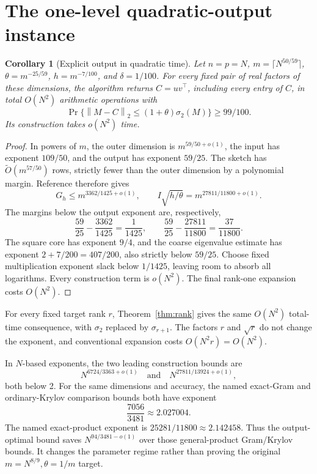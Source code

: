 \documentclass[11pt]{article}
\newtheorem{corollary}[theorem]{Corollary}
\newcommand{\norm}[1]{\left\lVert#1\right\rVert}
\newcommand{\tO}{\widetilde O}
\begin{document}
\section{The one-level quadratic-output instance}
\begin{corollary}[Explicit output in quadratic time]\label{cor:output}
Let \(n=p=N\), \(m=\lceil N^{50/59}\rceil\),
\(\theta=m^{-25/59}\), \(h=m^{-7/100}\), and \(\delta=1/100\).
For every fixed pair of real factors of these dimensions, the algorithm
returns \(C=uv^\top\), including every entry of \(C\), in total
\(O(N^2)\) arithmetic operations with
\[
 \Pr\{\norm{M-C}_2\leq(1+\theta)\sigma_2(M)\}\geq99/100.
\]
Its construction takes \(o(N^2)\) time.
\end{corollary}
\begin{proof}
In powers of \(m\), the outer dimension is \(m^{59/50+o(1)}\),
the input has exponent \(109/50\), and the output has exponent
\(59/25\). The sketch has \(\tO(m^{57/50})\) rows, strictly fewer
than the outer dimension by a polynomial margin. Reference \cite{amanov}
therefore gives
\[
 G_h\leq m^{3362/1425+o(1)},\qquad
 I\sqrt{h/\theta}=m^{27811/11800+o(1)}.
\]
The margins below the output exponent are, respectively,
\[
 \frac{59}{25}-\frac{3362}{1425}=\frac1{1425},\qquad
 \frac{59}{25}-\frac{27811}{11800}=\frac{37}{11800}.
\]
The square core has exponent \(9/4\), and the coarse eigenvalue estimate
has exponent \(2+7/200=407/200\), also strictly below \(59/25\).
Choose fixed multiplication exponent slack below \(1/1425\), leaving
room to absorb all logarithms. Every construction term is \(o(N^2)\).
The final rank-one expansion costs \(O(N^2)\).
\end{proof}

For every fixed target rank \(r\), Theorem~\ref{thm:rank} gives the same
\(O(N^2)\) total-time consequence, with \(\sigma_2\) replaced by
\(\sigma_{r+1}\). The factors \(r\) and \(\sqrt r\) do not change
the exponent, and conventional expansion costs \(O(N^2r)=O(N^2)\).

In \(N\)-based exponents, the two leading construction bounds are
\[
 N^{6724/3363+o(1)}\quad\text{and}\quad
 N^{27811/13924+o(1)},
\]
both below 2. For the same dimensions and accuracy, the named exact-Gram
and ordinary-Krylov comparison bounds both have exponent
\[
 \frac{7056}{3481}\approx2.027004.
\]
The named exact-product exponent is \(25281/11800\approx2.142458\).
Thus the output-optimal bound saves \(N^{94/3481-o(1)}\) over those
general-product Gram/Krylov bounds. It changes the parameter regime rather
than proving the original \(m=N^{8/9},\theta=1/m\) target.
\end{document}
